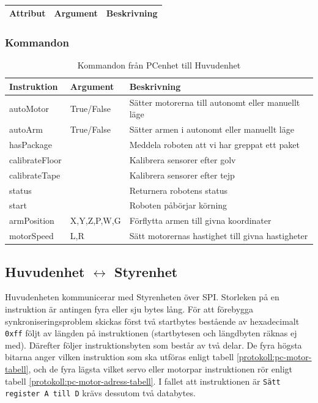 \begin{table}[h!]
	\centering
	\begin{tabularx}{\textwidth}{| l | X | X |}
		\hline
		\textbf{Attribut} & \textbf{Argument} & {\textbf{Beskrivning}}\\\hline
	\end{tabularx}
	\caption{} \label{kommunikation-pc-huvud-status}
\end{table}

\subsubsection{Kommandon}

\begin{table}[h!]
	\centering
	\begin{tabularx}{\textwidth}{| l | l | X |}
		\hline
		\textbf{Instruktion} & \textbf{Argument} & \textbf{Beskrivning} \\\hline
		{autoMotor} & {True/False} & {Sätter motorerna till autonomt eller manuellt läge} \\\hline
		{autoArm} & {True/False} & {Sätter armen i autonomt eller manuellt läge} \\\hline
		{hasPackage} & {} & {Meddela roboten att vi har greppat ett paket} \\\hline
		{calibrateFloor} & {} & {Kalibrera sensorer efter golv} \\\hline
		{calibrateTape} & {} & {Kalibrera sensorer efter tejp} \\\hline
		{status} & {} & {Returnera robotens status} \\\hline
		{start} & {} & {Roboten påbörjar körning} \\\hline
		{armPosition} & {X,Y,Z,P,W,G} & {Förflytta armen till givna koordinater} \\\hline
		{motorSpeed} & {L,R} & {Sätt motorernas hastighet till givna hastigheter} \\\hline
	\end{tabularx}
	\caption{Kommandon från PCenhet till Huvudenhet} \label{protokoll:pc-huvud-tabell}
\end{table}

\subsection{Huvudenhet $\longleftrightarrow$ Styrenhet}

Huvudenheten kommunicerar med Styrenheten över SPI. Storleken på en instruktion är antingen fyra eller sju bytes lång. För att förebygga synkroniseringsproblem skickas först två startbytes bestående av hexadecimalt \texttt{0xff} följt av längden på instruktionen (startbytesen och längdbyten räknas ej med). Därefter följer instruktionsbyten som består av två delar. De fyra högsta bitarna anger vilken instruktion som ska utföras enligt tabell \ref{protokoll:pc-motor-tabell}, och de fyra lägsta vilket servo eller motorpar instruktionen rör enligt tabell \ref{protokoll:pc-motor-adress-tabell}. I fallet att instruktionen är \texttt{Sätt register A till D} krävs dessutom två databytes.

